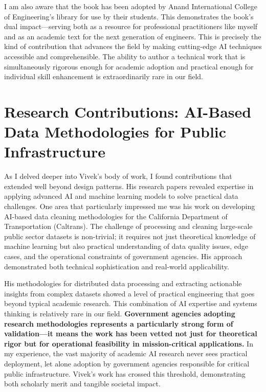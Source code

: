 \documentclass[11pt]{article}
\begin{document}
I am also aware that the book has been adopted by Anand International College of Engineering's library for use by their students. This demonstrates the book's dual impact---serving both as a resource for professional practitioners like myself and as an academic text for the next generation of engineers. This is precisely the kind of contribution that advances the field by making cutting-edge AI techniques accessible and comprehensible. The ability to author a technical work that is simultaneously rigorous enough for academic adoption and practical enough for individual skill enhancement is extraordinarily rare in our field.

\section*{Research Contributions: AI-Based Data Methodologies for Public Infrastructure}

As I delved deeper into Vivek's body of work, I found contributions that extended well beyond design patterns. His research papers revealed expertise in applying advanced AI and machine learning models to solve practical data challenges. One area that particularly impressed me was his work on developing AI-based data cleaning methodologies for the California Department of Transportation (Caltrans). The challenge of processing and cleaning large-scale public sector datasets is non-trivial; it requires not just theoretical knowledge of machine learning but also practical understanding of data quality issues, edge cases, and the operational constraints of government agencies. His approach demonstrated both technical sophistication and real-world applicability.

His methodologies for distributed data processing and extracting actionable insights from complex datasets showed a level of practical engineering that goes beyond typical academic research. This combination of AI expertise and systems thinking is relatively rare in our field. \textbf{Government agencies adopting research methodologies represents a particularly strong form of validation---it means the work has been vetted not just for theoretical rigor but for operational feasibility in mission-critical applications.} In my experience, the vast majority of academic AI research never sees practical deployment, let alone adoption by government agencies responsible for critical public infrastructure. Vivek's work has crossed this threshold, demonstrating both scholarly merit and tangible societal impact.
\end{document}
